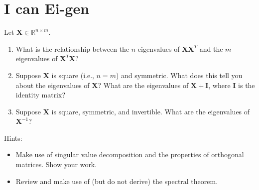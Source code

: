 \documentclass[submit]{harvardml}
\newcommand{\R}{\mathbb{R}}
\renewcommand{\v}[1]{\mathbf{#1}}
\begin{document}
\section*{I can Ei-gen}
\begin{problem}
    Let $\v X \in \R^{n \times m}$.
    \begin{enumerate}[label=(\alph*)]
        \item What is the relationship between the $n$ eigenvalues
              of $\v X \v X^T$ and the $m$ eigenvalues of $\v X^T \v X$?
        \item Suppose $\v X$ is square (i.e., $n=m$) and symmetric.
              What does this tell you about the eigenvalues of $\v X$?
              What are the eigenvalues of $\v X + \v I$, where $\v I$ is the identity matrix?
        \item Suppose $\v X$ is square, symmetric, and invertible.
			  What are the eigenvalues of $\v X^{-1}$?
	\end{enumerate}
	Hints:
	\begin{itemize}
		\item Make use of singular value decomposition and the properties
			  of orthogonal matrices. Show your work.
		\item Review and make use of (but do not derive) the spectral theorem.
	\end{itemize}
\end{problem}
\end{document}
